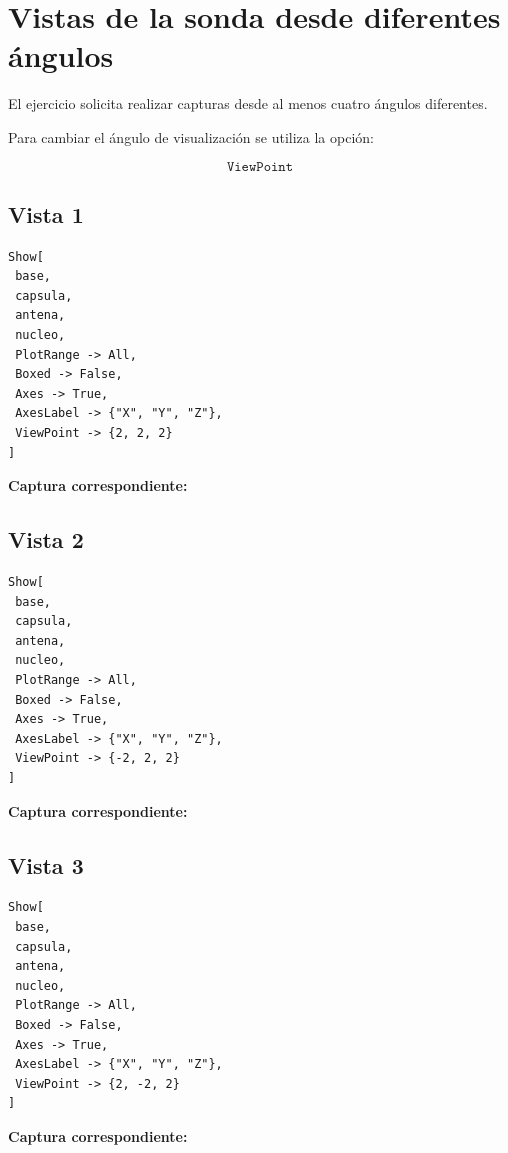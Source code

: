 \documentclass[12pt,a4paper]{article}
\begin{document}
\section{Vistas de la sonda desde diferentes ángulos}

El ejercicio solicita realizar capturas desde al menos cuatro
ángulos diferentes.

Para cambiar el ángulo de visualización se utiliza la opción:

\[
\texttt{ViewPoint}
\]

\subsection{Vista 1}

\begin{lstlisting}
Show[
 base,
 capsula,
 antena,
 nucleo,
 PlotRange -> All,
 Boxed -> False,
 Axes -> True,
 AxesLabel -> {"X", "Y", "Z"},
 ViewPoint -> {2, 2, 2}
]
\end{lstlisting}

\textbf{Captura correspondiente:}

\vspace{3cm}


\subsection{Vista 2}

\begin{lstlisting}
Show[
 base,
 capsula,
 antena,
 nucleo,
 PlotRange -> All,
 Boxed -> False,
 Axes -> True,
 AxesLabel -> {"X", "Y", "Z"},
 ViewPoint -> {-2, 2, 2}
]
\end{lstlisting}

\textbf{Captura correspondiente:}

\vspace{3cm}

\subsection{Vista 3}

\begin{lstlisting}
Show[
 base,
 capsula,
 antena,
 nucleo,
 PlotRange -> All,
 Boxed -> False,
 Axes -> True,
 AxesLabel -> {"X", "Y", "Z"},
 ViewPoint -> {2, -2, 2}
]
\end{lstlisting}

\textbf{Captura correspondiente:}

\vspace{3cm}
\end{document}
